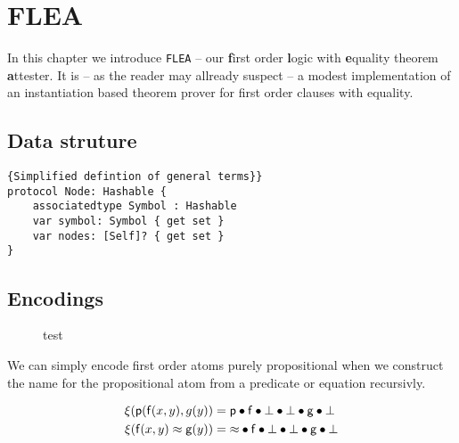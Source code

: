 
\chapter{FLEA}



In this chapter we introduce \verb|FLEA| --
our {\textbf f}irst order {\textbf l}ogic with {\textbf e}quality theorem {\textbf a}ttester. 
It is 
-- as the reader may allready suspect --
a modest implementation of an instantiation based theorem prover for first order clauses with equality.



\section{Data struture}

\begin{lstlisting}[language=flea]{Simplified defintion of general terms}}
protocol Node: Hashable {
	associatedtype Symbol : Hashable
	var symbol: Symbol { get set }
	var nodes: [Self]? { get set }
}
\end{lstlisting}

\section{Encodings}

\begin{figure}
	test
\end{figure}

We can simply encode first order atoms purely propositional 
when we construct the name for the propositional atom 
from a predicate or equation recursivly.

\begin{definition}
\end{definition}

\begin{example}
	\begin{align*}
	\xi({\mathsf p}({\mathsf f}(x,y),g(y)) &= {\mathsf p}\bullet{\mathsf f}\bullet\bot\bullet\bot\bullet{\mathsf g}\bullet\bot\\
	\xi({\mathsf f}(x,y)\approx {\mathsf g}(y)) &= {\approx}\bullet{\mathsf f}\bullet\bot\bullet\bot\bullet{\mathsf g}\bullet\bot\\
	\end{align*}
\end{example}

